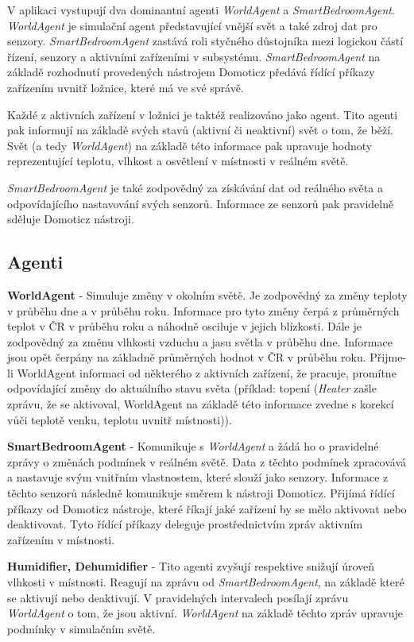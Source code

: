 \documentclass[a4paper,12pt]{article}
\begin{document}
    V aplikaci vystupují dva dominantní agenti \textit{WorldAgent} a \textit{SmartBedroomAgent}. \textit{WorldAgent} je simulační agent představující vnější svět a také zdroj dat pro senzory. \textit{SmartBedroomAgent} zastává roli styčného důstojníka mezi logickou částí řízení, senzory a aktivními zařízeními v subsystému. \textit{SmartBedroomAgent} na základě rozhodnutí provedených nástrojem Domoticz předává řídící příkazy zařízením uvnitř ložnice, které má ve své správě. 

    Každé z aktivních zařízení v ložnici je taktéž realizováno jako agent. Tito agenti pak informují na základě svých stavů (aktivní či neaktivní) svět o tom, že běží. Svět (a tedy \textit{WorldAgent}) na základě této informace pak upravuje hodnoty reprezentující teplotu, vlhkost a osvětlení v místnosti v reálném světě.

    \textit{SmartBedroomAgent} je také zodpovědný za získávání dat od reálného světa a odpovídajícího nastavování svých senzorů. Informace ze senzorů pak pravidelně sděluje Domoticz nástroji.

    \subsection{Agenti}
    \textbf{WorldAgent} - Simuluje změny v okolním světě. Je zodpovědný za změny teploty v průběhu dne a v průběhu roku. Informace pro tyto změny čerpá z průměrných teplot v ČR v průběhu roku a náhodně osciluje v jejich blízkosti. Dále je zodpovědný za změnu vlhkosti vzduchu a jasu světla v průběhu dne. Informace jsou opět čerpány na základně průměrných hodnot v ČR v průběhu roku. Přijme-li WorldAgent informaci od některého z aktivních zařízení, že pracuje, promítne odpovídající změny do aktuálního stavu světa (příklad: topení (\textit{Heater} zašle zprávu, že se aktivoval, WorldAgent na základě této informace zvedne s korekcí vůči teplotě venku, teplotu uvnitř místnosti)).
    
    \textbf{SmartBedroomAgent} - Komunikuje s \textit{WorldAgent} a žádá ho o pravidelné zprávy o změnách podmínek v reálném světě. Data z těchto podmínek zpracovává a nastavuje svým vnitřním vlastnostem, které slouží jako senzory. Informace z těchto senzorů následně komunikuje směrem k nástroji Domoticz. Přijímá řídící příkazy od Domoticz nástroje, které říkají jaké zařízení by se mělo aktivovat nebo deaktivovat. Tyto řídící příkazy deleguje prostřednictvím zpráv aktivním zařízením v místnosti. 
    
    \textbf{Humidifier, Dehumidifier} - Tito agenti zvyšují respektive snižují úroveň vlhkosti v místnosti. Reagují na zprávu od \textit{SmartBedroomAgent}, na základě které se aktivují nebo deaktivují. V pravidelných intervalech posílají zprávu \textit{WorldAgent} o tom, že jsou aktivní. \textit{WorldAgent} na základě těchto zpráv upravuje podmínky v simulačním světě.
    
\end{document}
